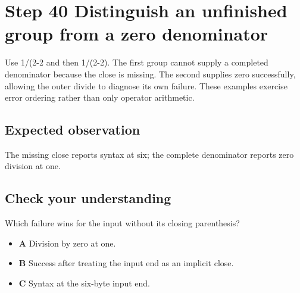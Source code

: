 \section{Step 40 Distinguish an unfinished group from a zero denominator}\label{expression-s40}

Use 1/(2-2 and then 1/(2-2). The first group cannot supply a completed denominator because the close is missing. The second supplies zero successfully, allowing the outer divide to diagnose its own failure. These examples exercise error ordering rather than only operator arithmetic.

\subsection{Expected observation}
The missing close reports syntax at six; the complete denominator reports zero division at one.

\subsection{Check your understanding}
Which failure wins for the input without its closing parenthesis?

\begin{itemize}
  \item \textbf{A} Division by zero at one.
  \item \textbf{B} Success after treating the input end as an implicit close.
  \item \textbf{C} Syntax at the six-byte input end.
\end{itemize}
